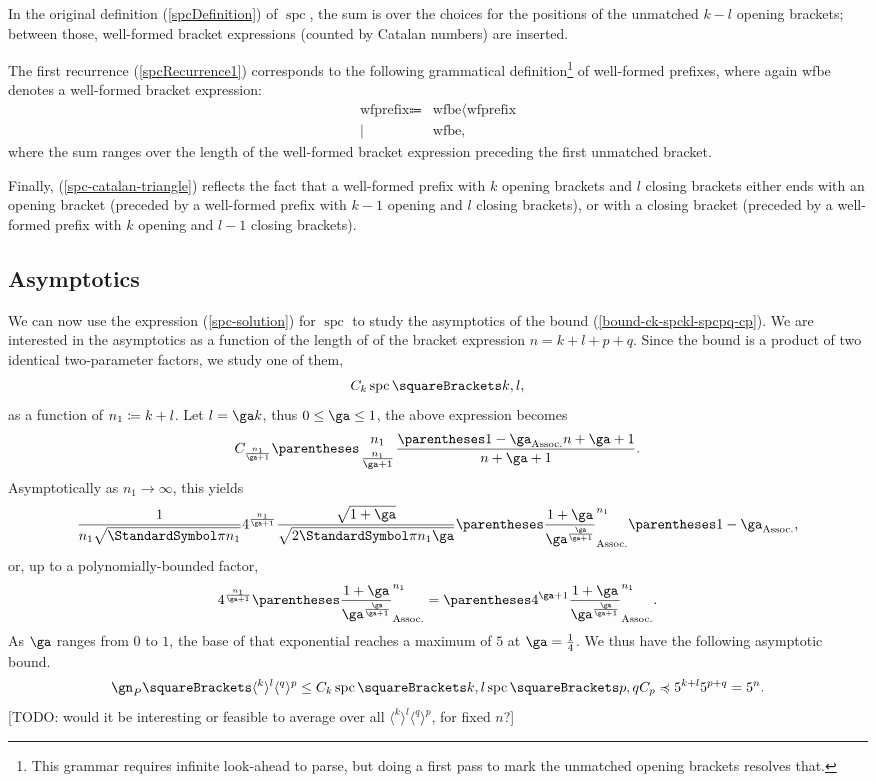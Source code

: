 \documentclass[10pt, a4paper, twoside]{basestyle}
\DeclareMathOperator{\spc}{spc}
\begin{document}
In the original definition (\ref{spcDefinition}) of $\spc$, the sum is over the choices for the positions of the
unmatched $k-l$ opening brackets; between those, well-formed bracket expressions (counted by Catalan numbers) are
inserted.

The first recurrence (\ref{spcRecurrence1}) corresponds to the following grammatical
definition\footnote{This grammar requires infinite look-ahead to parse, but doing a first pass to mark the
unmatched opening brackets resolves that.} of well-formed
prefixes, where again wfbe denotes a well-formed bracket expression:
\begin{align*}
\text{wfprefix} \Coloneq
& \text{wfbe} \langle \text{wfprefix} \\
\mid\: & \text{wfbe},
\end{align*}
where the sum ranges over the length of the well-formed bracket expression preceding the first unmatched bracket.

Finally, (\ref{spc-catalan-triangle}) reflects the fact that a well-formed prefix with $k$ opening brackets
and $l$ closing brackets either ends with an opening bracket (preceded by a well-formed prefix with $k-1$ opening
and $l$ closing brackets), or with a closing bracket (preceded by a well-formed prefix with $k$ opening
and $l-1$ closing brackets).
\subsection{Asymptotics}
We can now use the expression (\ref{spc-solution}) for $\spc$ to study the asymptotics of the bound
(\ref{bound-ck-spckl-spcpq-cp}).
We are interested in the asymptotics as a function of the length of of the bracket expression $n = k+l+p+q$.
Since the bound is a product of two identical two-parameter factors, we study one of them,\[
C_k\spc\of{k,l}\text,
\]
as a function of $n_1\coloneq k+l$. Let $l = \ga k$, thus $0\leq \ga\leq 1$,
the above expression becomes \[
C_{\frac{n_1}{\ga + 1}} \binom{n_1}{\frac{n_1}{\ga + 1}} \frac{\pa{1-\ga}n+\ga+1}{n+\ga+1}\text.
\]
Asymptotically as $n_1\longrightarrow \infty$, this yields\[
\frac
  {1}
  {n_1\sqrt{\Pi n_1}}
4^{\frac{n_1}{\ga + 1}}
\frac
  {\sqrt{1+\ga}}
  {\sqrt{2\Pi n_1 \ga}}
\pa{
  \frac
    {1+\ga}
    {\ga^{\frac{\ga}{\ga + 1}}}}^{n_1}
\pa{1-\ga}\text,
\]
or, up to a polynomially-bounded factor,\[
4^{\frac{n_1}{\ga + 1}}
\pa{
  \frac
    {1+\ga}
    {\ga^{\frac{\ga}{\ga + 1}}}}^{n_1}
=
\pa{
4^{\ga + 1}
\frac
  {1+\ga}
  {\ga^{\frac{\ga}{\ga + 1}}}}^{n_1}\text.
\]
As $\ga$ ranges from $0$ to $1$, the base of that exponential reaches a maximum of $5$ at
$\ga=\frac 1 4$. We thus have the following asymptotic bound.\begin{equation}
\gn_P\of{\langle^k\rangle^l\langle^q\rangle^p}\leq
C_k\spc\of{k, l}\spc\of{p, q}C_p
\preccurlyeq
5^{k+l}5^{p+q} = 5^n
\text.
\end{equation}
[TODO: would it be interesting or feasible to average over all $\langle^k\rangle^l\langle^q\rangle^p$,
for fixed $n$?]
\clearpage
\nocite{*}


\end{document}
